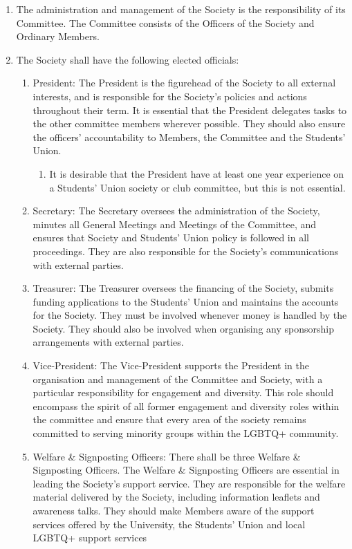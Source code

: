 \documentclass[12pt]{constitution}
\begin{document}
\begin{enumerate}
    \item The administration and management of the Society is the responsibility of its Committee. The Committee consists of the Officers of the Society and Ordinary Members.
    \item \label{subclause:elected-officials} The Society shall have the following elected officials:
    \begin{enumerate}
        \item President: The President is the figurehead of the Society to all external interests, and is responsible for the Society’s policies and actions throughout their term. It is essential that the President delegates tasks to the other committee members wherever possible. They should also ensure the officers’ accountability to Members, the Committee and the Students’ Union.
        \begin{enumerate}
            \item It is desirable that the President have at least one year experience on a Students’ Union society or club committee, but this is not essential.
        \end{enumerate}
        \item Secretary: The Secretary oversees the administration of the Society, minutes all General Meetings and Meetings of the Committee, and ensures that Society and Students’ Union policy is followed in all proceedings. They are also responsible for the Society’s communications with external parties.
        \item Treasurer: The Treasurer oversees the financing of the Society, submits funding applications to the Students’ Union and maintains the accounts for the Society. They must be involved whenever money is handled by the Society. They should also be involved when organising any sponsorship arrangements with external parties.
        \item Vice-President: The Vice-President supports the President in the organisation and management of the Committee and Society, with a particular responsibility for engagement and diversity. This role should encompass the spirit of all former engagement and diversity roles within the committee and ensure that every area of the society remains committed to serving minority groups within the LGBTQ+ community.
        \item Welfare \& Signposting Officers: There shall be three Welfare \& Signposting Officers. The Welfare \& Signposting Officers are essential in leading the Society’s support service. They are responsible for the welfare material delivered by the Society, including information leaflets and awareness talks. They should make Members aware of the support services offered by the University, the Students’ Union and local LGBTQ+ support services

\end{enumerate}
\end{enumerate}
\end{document}
